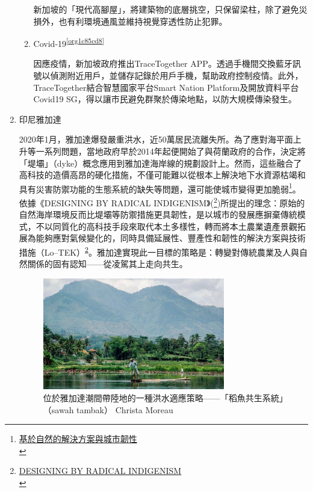 \documentclass[a4paper,12pt]{article}
\begin{document}
\begin{enumerate}
\begin{enumerate}
新加坡的「現代高腳屋」，將建築物的底層挑空，只保留梁柱，除了避免災損外，也有利環境通風並維持視覺穿透性防止犯罪。\\

\item Covid-19\textsuperscript{\ref{org1c85cd8}}
\label{sec:orge8ad0b6}

因應疫情，新加坡政府推出TraceTogether APP。透過手機間交換藍牙訊號以偵測附近用戶，並儲存記錄於用戶手機，幫助政府控制疫情。此外，TraceTogether結合智慧國家平台Smart Nation Platform及開放資料平台Covid19 SG，得以讓市民避免群聚於傳染地點，以防大規模傳染發生。\\
\end{enumerate}

\item 印尼雅加達
\label{sec:orga624ed6}

2020年1月，雅加達爆發嚴重洪水，近50萬居民流離失所。為了應對海平面上升等一系列問題，當地政府早於2014年起便開始了與荷蘭政府的合作，決定將「堤壩」（dyke）概念應用到雅加達海岸線的規劃設計上。然而，這些融合了高科技的造價高昂的硬化措施，不僅可能難以從根本上解決地下水資源枯竭和具有災害防禦功能的生態系統的缺失等問題，還可能使城市變得更加脆弱\footnote{\href{https://twgreatdaily.com/OR8rtHMBLq-Ct6CZ8wQ5.html}{基於自然的解決方案與城市韌性}\\\label{orgc8718e9}}。\\

依據《DESIGNING BY RADICAL INDIGENISM》(\footnote{\href{http://113.31.19.9/Qikan/Article/Detail?id=7102610394\&from=Qikan\_Search\_Index}{DESIGNING BY RADICAL INDIGENISM}\\\label{org38927dc}})所提出的理念：原始的自然海岸環境反而比堤壩等防禦措施更具韌性，是以城市的發展應摒棄傳統模式，不以同質化的高科技手段來取代本土多樣性，轉而將本土農業遺產景觀拓展為能夠應對氣候變化的，同時具備延展性、豐產性和韌性的解決方案與技術措施（Lo–TEK）\textsuperscript{\ref{org38927dc}}。雅加達實現此一目標的策略是：轉變對傳統農業及人與自然關係的固有認知——從凌駕其上走向共生。\\
\begin{figure}[htbp]
\centering
\includegraphics[width=300]{images/oOKotHMBeElxlkka9awL.jpg}
\caption{\label{fig:yd-1}位於雅加達潮間帶陸地的一種洪水適應策略——「稻魚共生系統」（sawah tambak） Christa Moreau}
\end{figure}


\end{enumerate}
\end{document}
